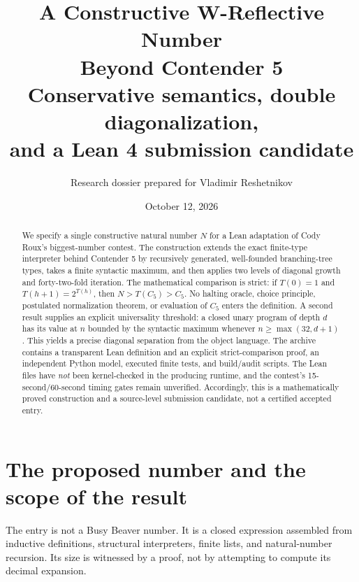 \documentclass[11pt]{article}
\title{\vspace{-1.4em}\textbf{A Constructive W-Reflective Number\\Beyond Contender 5}\\[0.45em]
\large Conservative semantics, double diagonalization,\\and a Lean 4 submission candidate}
\author{Research dossier prepared for Vladimir Reshetnikov}
\date{October 12, 2026}
\theoremstyle{definition}
\newcommand{\Cfive}{C_5}
\begin{document}
\maketitle
\begin{abstract}
We specify a single constructive natural number $N$ for a Lean adaptation of
Cody Roux's biggest-number contest. The construction extends the exact
finite-type interpreter behind Contender 5 by recursively generated,
well-founded branching-tree types, takes a finite syntactic maximum, and then
applies two levels of diagonal growth and forty-two-fold iteration. The
mathematical comparison is strict: if $T(0)=1$ and $T(h+1)=2^{T(h)}$, then
$N>T(\Cfive)>\Cfive$. No halting oracle, choice principle, postulated
normalization theorem, or evaluation of $\Cfive$ enters the definition.
A second result supplies an explicit universality threshold: a closed unary
program of depth $d$ has its value at $n$ bounded by the syntactic maximum
whenever $n\ge\max(32,d+1)$. This yields a precise diagonal separation from the
object language. The archive contains a transparent Lean definition and an
explicit strict-comparison proof, an independent Python model, executed finite
tests, and build/audit scripts. The Lean files have \emph{not} been kernel-checked
in the producing runtime, and the contest's 15-second/60-second timing gates
remain unverified. Accordingly, this is a mathematically proved construction
and a source-level submission candidate, not a certified accepted entry.
\end{abstract}
\begin{center}
\end{center}
\clearpage
\tableofcontents
\clearpage

\section{The proposed number and the scope of the result}
The entry is not a Busy Beaver number. It is a closed expression assembled from
inductive definitions, structural interpreters, finite lists, and natural-number
recursion. Its size is witnessed by a proof, not by attempting to compute its
decimal expansion.
\end{document}
